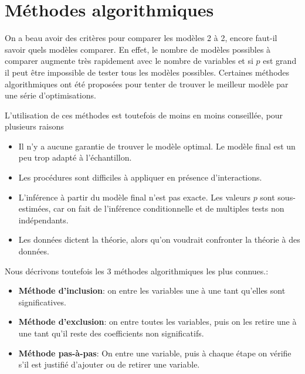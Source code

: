 \section{Méthodes algorithmiques}

On a beau avoir des critères pour comparer les modèles 2 à 2, encore faut-il savoir quels modèles comparer. En effet, le nombre de modèles possibles à comparer augmente très rapidement avec le nombre de variables et si $p$ est grand il peut être impossible de tester tous les modèles possibles. Certaines méthodes algorithmiques ont été proposées pour tenter de trouver le meilleur modèle par une série d'optimisations.


L'utilisation de ces méthodes est toutefois de moins en moins conseillée, pour plusieurs raisons
\begin{itemize}
\item[$\bullet$] Il n'y a aucune garantie de trouver le modèle optimal. Le modèle final est un peu trop adapté à l'échantillon.
\item[$\bullet$] Les procédures sont difficiles à appliquer en présence d'interactions.
\item[$\bullet$] L'inférence à partir du modèle final n'est pas exacte. Les valeurs $p$ sont sous-estimées, car on fait de l'inférence conditionnelle et de multiples tests non indépendants.
\item[$\bullet$] Les données dictent la théorie, alors qu'on voudrait confronter la théorie à des données.
\end{itemize}

Nous décrivons toutefois les 3 méthodes algorithmiques les plus connues.:

\begin{itemize}
  \item \textbf{Méthode d'inclusion}: on entre les variables une à une tant qu'elles sont significatives.
  \item \textbf{Méthode d'exclusion}: on entre toutes les variables, puis on les retire une à une tant qu'il reste des coefficients non significatifs.
  \item \textbf{Méthode pas-à-pas}: On entre une variable, puis à chaque étape on vérifie s'il est justifié d'ajouter ou de retirer une variable.
\end{itemize}

